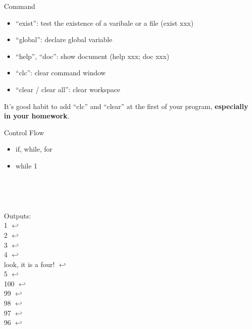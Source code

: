 \documentclass{beamer}
\begin{document}
\begin{frame}{Command}
\begin{itemize}
\item ``exist'': test the existence of a varibale or a file (exist xxx)
\item ``global'': declare global variable
\item ``help'', ``doc'': show document (help xxx; doc xxx)
\item ``clc'': clear command window
\item ``clear / clear all'': clear workspace
\end{itemize}
It's good habit to add ``clc'' and ``clear'' at the first of your program, \textbf{especially in your homework}.
\end{frame}

\begin{frame}{Control Flow}
\begin{itemize}
\item if, while, for
\item while 1
\end{itemize}
\begin{minipage}{0.05\textwidth}
~\\
\end{minipage}
\begin{minipage}{0.5\textwidth}

\end{minipage}
\begin{minipage}{0.05\textwidth}
~\\
\end{minipage}
\begin{minipage}{0.35\textwidth}
Outputs: \\
1 $\hookleftarrow$ \\
2 $\hookleftarrow$ \\
3 $\hookleftarrow$ \\
4 $\hookleftarrow$ \\
look, it is a four! $\hookleftarrow$ \\
5 $\hookleftarrow$ \\
100 $\hookleftarrow$ \\
99 $\hookleftarrow$ \\
98 $\hookleftarrow$ \\
97 $\hookleftarrow$ \\
96 $\hookleftarrow$ \\
\end{minipage}
\end{frame}
\end{document}

